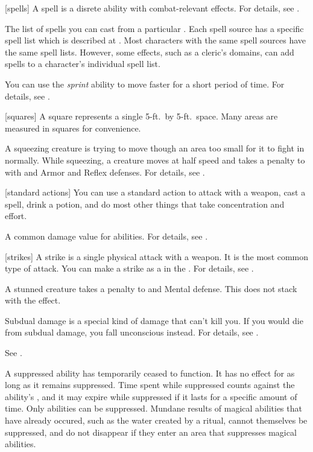 [spells] A spell is a disrete  ability with combat-relevant effects.
For details, see .

 The list of spells you can cast from a particular .
Each spell source has a specific spell list which is described at .
Most characters with the same spell sources have the same spell lists.
However, some effects, such as a cleric's domains, can add spells to a character's individual spell list.

 You can use the \textit{sprint} ability to move faster for a short period of time.
For details, see .

[squares] A square represents a single 5-ft.\ by 5-ft.\ space.
Many areas are measured in squares for convenience.

 A squeezing creature is trying to move though an area too small for it to fight in normally.
While squeezing, a creature moves at half speed and takes a  penalty to  with  and Armor and Reflex defenses.
For details, see .

[standard actions] You can use a standard action to attack with a weapon, cast a spell, drink a potion, and do most other things that take concentration and effort.

 A common damage value for abilities.
For details, see .

[strikes] A strike is a single physical attack with a weapon.
It is the most common type of attack.
You can make a strike as a  in the .
For details, see .

 A stunned creature takes a  penalty to  and Mental defense.
This does not stack with the  effect.

 Subdual damage is a special kind of damage that can't kill you.
If you would die from subdual damage, you fall unconscious instead.
For details, see .

 See .

 A suppressed ability has temporarily ceased to function.
It has no effect for as long as it remains suppressed.
Time spent while suppressed counts against the ability's , and it may expire while suppressed if it lasts for a specific amount of time.
Only  abilities can be suppressed.
Mundane results of magical abilities that have already occured, such as the water created by a  ritual, cannot themselves be suppressed, and do not disappear if they enter an area that suppresses magical abilities.

